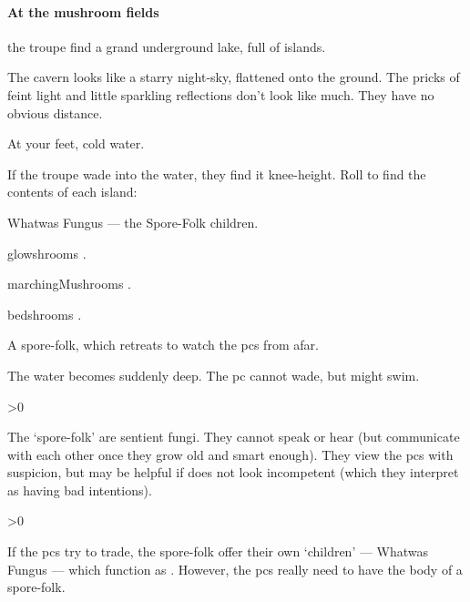 \documentclass[10pt,twoside]{book}
\begin{document}
\paragraph{At the mushroom fields}
the troupe find a grand underground lake, full of islands.


\begin{boxtext}
  The cavern looks like a starry night-sky, flattened onto the ground.
  The pricks of feint light and little sparkling reflections don't look like much.
  They have no obvious distance.

  At your feet, cold water.
\end{boxtext}

If the troupe wade into the water, they find it knee-height.
Roll to find the contents of each island:

{
  \footnotesize
  \begin{dlist}
    \item
    Whatwas Fungus --- the Spore-Folk children.
    \item
    \Glspl{glowshroom} .
    \item
    \Glspl{marchingMushroom} .
    \item
    \Glspl{bedshroom} .
    \item
    A spore-folk, which retreats to watch the \glspl{pc} from afar.
    \item
    The water becomes suddenly deep.
    The \gls{pc} cannot wade, but might swim.
  \end{dlist}
}

\randomize

\sporeFolk

\ifnum\value{Charisma}>0
  {\small\showStdSpells}
\fi

The `spore-folk' are sentient fungi.
They cannot speak or hear (but communicate with each other once they grow old and smart enough).
They view the \glspl{pc} with suspicion, but may be helpful if  does not look incompetent (which they interpret as having bad intentions).

\sporeFolk

\ifnum\value{Charisma}>0
  {\small\showStdSpells}
\fi

If the \glspl{pc} try to trade, the spore-folk offer their own `children' --- Whatwas Fungus --- which function as .
However, the \glspl{pc} really need to have the body of a spore-folk.

\wotWosFungus
\end{document}
